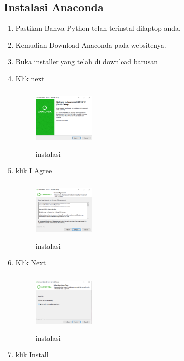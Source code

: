 \subsection{Instalasi Anaconda}
\begin{enumerate}
    \item Pastikan Bahwa Python telah terinstal dilaptop anda.
    \item Kemudian Download Anaconda pada websitenya.
    \item Buka installer yang telah di download barusan
    \item Klik next
     \begin{figure}[!htbp]
        \centering
        \includegraphics[width=3cm,height=3cm]{figures/habib/ss1.png}
        \caption{instalasi}
        \label{instalasi}
        \end{figure}
    \item klik I Agree
    \begin{figure}[!htbp]
        \centering
        \includegraphics[width=3cm,height=3cm]{figures/habib/ss2.png}
        \caption{instalasi}
        \label{instalasi}
        \end{figure}
    \item Klik Next
    \begin{figure}[!htbp]
        \centering
        \includegraphics[width=3cm,height=3cm]{figures/habib/ss3.png}
        \caption{instalasi}
        \label{instalasi}
        \end{figure}
    \item klik Install

\end{enumerate}
